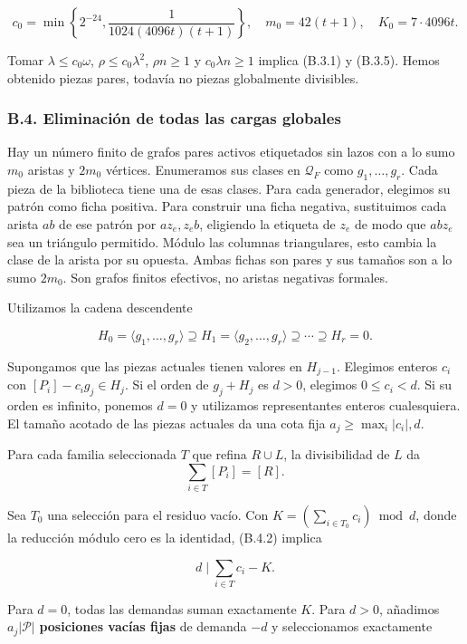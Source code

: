 \documentclass[spanish,11pt,a4paper]{article}
\begin{document}
\[c_0=\min\left\{2^{-24},\frac1{1024(4096t)(t+1)}\right\},\quad
m_0=42(t+1),\quad K_0=7\cdot4096t.
\tag{B.3.6}\]

Tomar \(\lambda\le c_0\omega\), \(\rho\le c_0\lambda^2\), \(\rho n\ge1\) y \(c_0\lambda n\ge1\) implica (B.3.1) y (B.3.5). Hemos obtenido piezas pares, todavía no piezas globalmente divisibles.

\subsubsection{B.4. Eliminación de todas las cargas globales}\label{b.4.-eliminaciuxf3n-de-todas-las-cargas-globales}

Hay un número finito de grafos pares activos etiquetados sin lazos con a lo sumo \(m_0\) aristas y \(2m_0\) vértices. Enumeramos sus clases en \(\mathcal Q_F\) como \(g_1,\ldots,g_r\). Cada pieza de la biblioteca tiene una de esas clases. Para cada generador, elegimos su patrón como ficha positiva. Para construir una ficha negativa, sustituimos cada arista \(ab\) de ese patrón por \(az_e,z_eb\), eligiendo la etiqueta de \(z_e\) de modo que \(abz_e\) sea un triángulo permitido. Módulo las columnas triangulares, esto cambia la clase de la arista por su opuesta. Ambas fichas son pares y sus tamaños son a lo sumo \(2m_0\). Son grafos finitos efectivos, no aristas negativas formales.

Utilizamos la cadena descendente

\[H_0=\langle g_1,\ldots,g_r\rangle\supseteq H_1
=\langle g_2,\ldots,g_r\rangle\supseteq\cdots\supseteq H_r=0.
\tag{B.4.1}\]

Supongamos que las piezas actuales tienen valores en \(H_{j-1}\). Elegimos enteros \(c_i\) con \([P_i]-c_ig_j\in H_j\). Si el orden de \(g_j+H_j\) es \(d>0\), elegimos \(0\le c_i<d\). Si su orden es infinito, ponemos \(d=0\) y utilizamos representantes enteros cualesquiera. El tamaño acotado de las piezas actuales da una cota fija \(a_j\ge\max_i|c_i|,d\).

Para cada familia seleccionada \(T\) que refina \(R\cup L\), la divisibilidad de \(L\) da \[\sum_{i\in T}[P_i]=[R].
\tag{B.4.2}\]

Sea \(T_0\) una selección para el residuo vacío. Con \(K=(\sum_{i\in T_0}c_i)\bmod d\), donde la reducción módulo cero es la identidad, (B.4.2) implica

\[d\mid \sum_{i\in T}c_i-K.
\tag{B.4.3}\]

Para \(d=0\), todas las demandas suman exactamente \(K\). Para \(d>0\), añadimos \(a_j|\mathcal P|\) \textbf{posiciones vacías fijas} de demanda \(-d\) y seleccionamos exactamente
\end{document}
